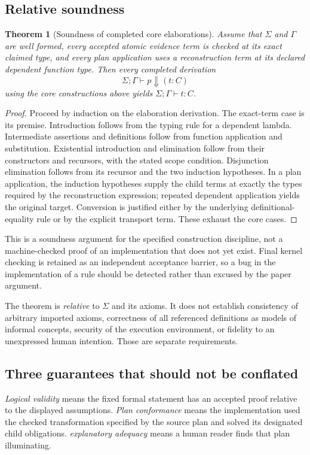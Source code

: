 \documentclass[11pt,a4paper]{article}
\newtheorem{theorem}{Theorem}[section]
\theoremstyle{definition}
\theoremstyle{remark}
\numberwithin{equation}{section}
\begin{document}
\subsection{Relative soundness}
\begin{theorem}[Soundness of completed core elaborations]
\label{thm:sound}
Assume that $\Sigma$ and $\Gamma$ are well formed, every accepted atomic evidence term is checked at its exact claimed type, and every plan application uses a reconstruction term at its declared dependent function type. Then every completed derivation
\[
 \Sigma;\Gamma\vdash p\Downarrow(t:C)
\]
using the core constructions above yields $\Sigma;\Gamma\vdash t:C$.
\end{theorem}
\begin{proof}
Proceed by induction on the elaboration derivation. The exact-term case is its premise. Introduction follows from the typing rule for a dependent lambda. Intermediate assertions and definitions follow from function application and substitution. Existential introduction and elimination follow from their constructors and recursors, with the stated scope condition. Disjunction elimination follows from its recursor and the two induction hypotheses. In a plan application, the induction hypotheses supply the child terms at exactly the types required by the reconstruction expression; repeated dependent application yields the original target. Conversion is justified either by the underlying definitional-equality rule or by the explicit transport term. These exhaust the core cases.
\end{proof}
This is a soundness argument for the specified construction discipline, not a machine-checked proof of an implementation that does not yet exist. Final kernel checking is retained as an independent acceptance barrier, so a bug in the implementation of a rule should be detected rather than excused by the paper argument.

The theorem is \emph{relative} to $\Sigma$ and its axioms. It does not establish consistency of arbitrary imported axioms, correctness of all referenced definitions as models of informal concepts, security of the execution environment, or fidelity to an unexpressed human intention. Those are separate requirements.

\subsection{Three guarantees that should not be conflated}
\emph{Logical validity} means the fixed formal statement has an accepted proof relative to the displayed assumptions. \emph{Plan conformance} means the implementation used the checked transformation specified by the source plan and solved its designated child obligations. \emph{explanatory adequacy} means a human reader finds that plan illuminating.
\end{document}
